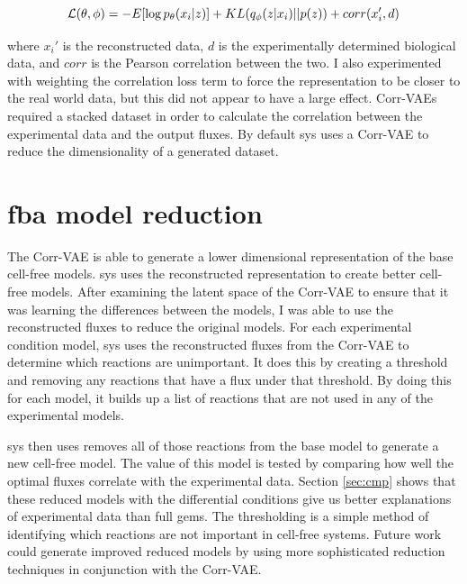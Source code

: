 \begin{equation}\label{eqn:corr-loss}
\mathcal{L}(\theta, \phi) = - E[\log p_{\theta}(x_i | z)] + KL(q_{\phi}(z | x_i) || p(z)) + corr(x_i', d)\\
\end{equation}

where $x_i'$ is the reconstructed data, $d$ is the experimentally determined biological data, and $corr$ is the Pearson correlation between the two.
I also experimented with weighting the correlation loss term to force the representation to be closer to the real world data, but this did not appear to have a large effect.
Corr-VAEs required a stacked dataset in order to calculate the correlation between the experimental data and the output fluxes.
By default \gls{sys} uses a Corr-VAE to reduce the dimensionality of a generated dataset.

\section{\gls{fba} model reduction}
The Corr-VAE is able to generate a lower dimensional representation of the base cell-free models.
\gls{sys} uses the reconstructed representation to create better cell-free models.
After examining the latent space of the Corr-VAE to ensure that it was learning the differences between the models, I was able to use the reconstructed fluxes to reduce the original models.
For each experimental condition model, \gls{sys} uses the reconstructed fluxes from the Corr-VAE to determine which reactions are unimportant.
It does this by creating a threshold and removing any reactions that have a flux under that threshold.
By doing this for each model, it builds up a list of reactions that are not used in any of the experimental models.

\gls{sys} then uses removes all of those reactions from the base model to generate a new cell-free model.
The value of this model is tested by comparing how well the optimal fluxes correlate with the experimental data.
Section \ref{sec:cmp} shows that these reduced models with the differential conditions give us better explanations of experimental data than full \glspl{gem}.
The thresholding is a simple method of identifying which reactions are not important in cell-free systems.
Future work could generate improved reduced models by using more sophisticated reduction techniques in conjunction with the Corr-VAE.